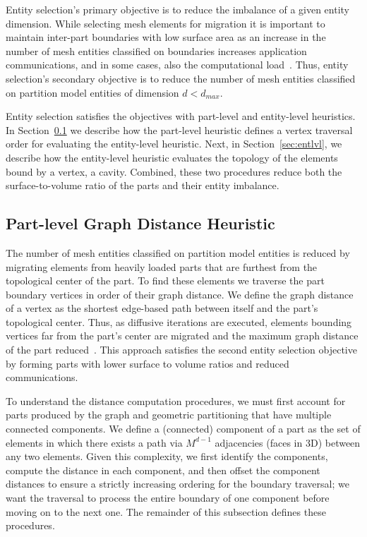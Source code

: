 Entity selection's primary objective is to reduce the imbalance of a given
entity dimension.
While selecting mesh elements for migration it is important to maintain
inter-part boundaries with low surface area as an increase in the number of
mesh entities classified on boundaries increases application
communications, and in some cases, also the computational
load~\cite{janWhi99}.
Thus, entity selection's secondary objective is to reduce the number of mesh
entities classified on partition model entities of dimension $d<d_{max}$.

Entity selection satisfies the objectives with part-level and entity-level
heuristics.
In Section~\ref{sec:partlvl} we describe how the part-level heuristic
defines a vertex traversal order for evaluating the entity-level
heuristic.
Next, in Section~\ref{sec:entlvl}, we describe how the entity-level heuristic
evaluates the topology of the elements bound by a vertex, a cavity.
Combined, these two procedures reduce both the surface-to-volume ratio of the
parts and their entity imbalance.

\subsection{Part-level Graph Distance Heuristic}\label{sec:partlvl}
The number of mesh entities classified on partition model entities is reduced by
migrating elements from heavily loaded parts that are furthest from the
topological center of the part.
To find these elements we traverse the part boundary vertices in order of their
graph distance.
We define the graph distance of a vertex as the shortest edge-based path between
itself and the part's topological center.
Thus, as diffusive iterations are executed, elements bounding vertices far from
the part's center are migrated and the maximum graph distance of the part
reduced~\cite{diekmann2000shape,meyerhenke2005balancing}.
This approach satisfies the second entity selection objective by forming parts
with lower surface to volume ratios and reduced communications.

To understand the distance computation procedures, we must first account for
parts produced by the graph and geometric partitioning that have multiple
connected components.
We define a (connected) component of a part as the set of elements in which there
exists a path via $M^{d-1}$ adjacencies (faces in 3D) between any two elements.
Given this complexity, we first identify the components, compute the
distance in each component, and then offset the component distances to ensure a
strictly increasing ordering for the boundary traversal; we want the traversal to
process the entire boundary of one component before moving on to the next one.
The remainder of this subsection defines these procedures.

